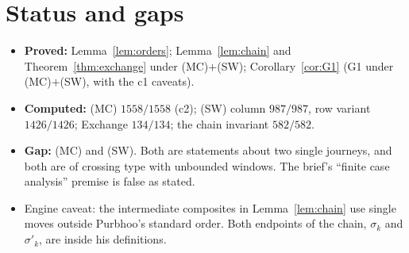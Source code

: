 \documentclass[11pt]{article}
\theoremstyle{definition}
\begin{document}
\section{Status and gaps}
\begin{itemize}
\item \textbf{Proved:} Lemma~\ref{lem:orders}; Lemma~\ref{lem:chain} and Theorem~\ref{thm:exchange} under (MC)$+$(SW);
Corollary~\ref{cor:G1} (G1 under (MC)$+$(SW), with the c1 caveats).
\item \textbf{Computed:} (MC) $1558/1558$ (c2); (SW) column $987/987$, row variant $1426/1426$; Exchange $134/134$; the chain invariant $582/582$.
\item \textbf{Gap:} (MC) and (SW). Both are statements about two single journeys, and both are of crossing type with unbounded windows.
The brief's ``finite case analysis'' premise is false as stated.
\item Engine caveat: the intermediate composites in Lemma~\ref{lem:chain} use single moves outside Purbhoo's standard order. Both endpoints of
the chain, $\sigma_k$ and $\sigma'_k$, are inside his definitions.
\end{itemize}
\end{document}
